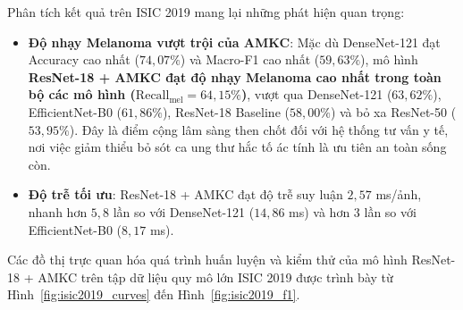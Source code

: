 \begin{table}[htbp]
\centering
\caption{Kết quả đối sánh các mô hình trên tập kiểm thử ISIC 2019 (Seed 42, TTA)}
\label{tab:isic2019_results}
\small
\setlength{\tabcolsep}{4pt}
\end{table}

Phân tích kết quả trên ISIC 2019 mang lại những phát hiện quan trọng:
\begin{itemize}
  \item \textbf{Độ nhạy Melanoma vượt trội của AMKC}: Mặc dù DenseNet-121 đạt Accuracy cao nhất ($74{,}07\%$) và Macro-F1 cao nhất ($59{,}63\%$), mô hình \textbf{ResNet-18 + AMKC đạt độ nhạy Melanoma cao nhất trong toàn bộ các mô hình ($\mathrm{Recall}_{\mathrm{mel}} = 64{,}15\%$)}, vượt qua DenseNet-121 ($63{,}62\%$), EfficientNet-B0 ($61{,}86\%$), ResNet-18 Baseline ($58{,}00\%$) và bỏ xa ResNet-50 ($53{,}95\%$). Đây là điểm cộng lâm sàng then chốt đối với hệ thống tư vấn y tế, nơi việc giảm thiểu bỏ sót ca ung thư hắc tố ác tính là ưu tiên an toàn sống còn.
  \item \textbf{Độ trễ tối ưu}: ResNet-18 + AMKC đạt độ trễ suy luận $2{,}57$ ms/ảnh, nhanh hơn $5{,}8$ lần so với DenseNet-121 ($14{,}86$ ms) và hơn $3$ lần so với EfficientNet-B0 ($8{,}17$ ms).
\end{itemize}

Các đồ thị trực quan hóa quá trình huấn luyện và kiểm thử của mô hình ResNet-18 + AMKC trên tập dữ liệu quy mô lớn ISIC 2019 được trình bày từ Hình~\ref{fig:isic2019_curves} đến Hình~\ref{fig:isic2019_f1}.

